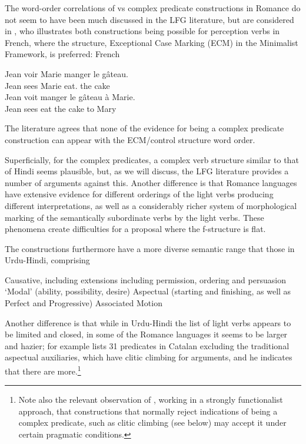 \documentclass[output=paper,hidelinks]{langscibook}
\begin{document}
The word-order correlations of {\XCOMP} vs complex predicate constructions in Romance
do not seem to have been much discussed in the LFG literature, but are considered
in \citet[982]{Sheehan2016}, who illustrates both constructions being possible for perception
verbs in French, where the {\XCOMP} structure, Exceptional Case Marking (ECM) in the Minimalist Framework, is
preferred:
\ea French
\begin{xlist}
\ex
\gll Jean voir Marie manger le g\^ateau.\\
Jean sees Marie eat.{\INF} the cake\\
\ex
\gll Jean voit manger le g\^ateau \`a Marie.\\
Jean sees eat the cake to Mary\\
\end{xlist}
\z
The literature agrees that none of the evidence for being a complex predicate construction
can appear with the ECM/control structure word order.

Superficially, for the complex predicates, a complex verb structure 
similar to that of Hindi seems plausible, but, as we will
discuss, the LFG literature provides a number of arguments against this. Another
difference is that Romance languages have extensive evidence for different orderings
of the light verbs producing different interpretations, as well as a considerably richer
system of morphological marking of the semantically subordinate verbs by the light verbs.
These phenomena create difficulties for a proposal where the f-structure is flat.

The constructions furthermore have a more diverse semantic range that those in
Urdu-Hindi, comprising
\ea
\begin{xlist}
\ex Causative, including extensions including permission, ordering and persuasion
\ex `Modal' (ability, possibility, desire) 
\ex Aspectual (starting and finishing, as well as Perfect and Progressive)
\ex Associated Motion
\end{xlist}
\z
Another difference is that while in Urdu-Hindi the list of light verbs appears to be
limited and closed, in some of the Romance languages it seems to be larger and hazier;
for example \citet[226--228]{Sola2002} lists 31 predicates in Catalan
excluding the traditional
aspectual auxiliaries, which have clitic climbing for arguments, and he indicates that
there are more.\footnote
 {Note also the relevant observation of \citet[185]{Garcia2009}, working in a strongly
  functionalist approach, that constructions that normally reject indications of
  being a complex predicate, such as clitic climbing (see below) may accept it under certain pragmatic
  conditions.}
\end{document}
